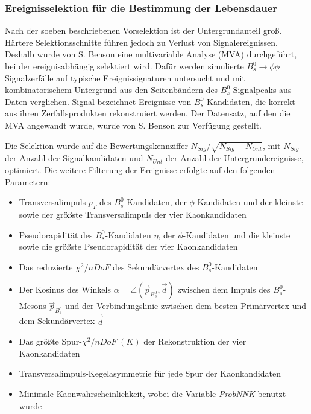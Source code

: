 \documentclass{article}
\begin{document}
\subsubsection{Ereignisselektion für die Bestimmung der Lebensdauer}%
Nach der soeben beschriebenen Vorselektion ist der Untergrundanteil groß. Härtere Selektionsschnitte führen jedoch zu Verlust von Signalereignissen. Deshalb wurde von S. Benson \cite{BensonANANOTE} eine multivariable Analyse (MVA) durchgeführt, bei der ereignisabhängig selektiert wird. Dafür werden simulierte $B_s^0 \rightarrow \phi \phi$ Signalzerfälle auf typische Ereignissignaturen untersucht und mit kombinatorischem Untergrund aus den Seitenbändern des $B_s^0$-Signalpeaks aus Daten verglichen. Signal bezeichnet Ereignisse von $B_s^0$-Kandidaten, die korrekt aus ihren Zerfallsprodukten rekonstruiert werden. Der Datensatz, auf den die MVA angewandt wurde, wurde von S. Benson zur Verfügung gestellt. 

Die Selektion wurde auf die Bewertungskennziffer %
$N_{Sig}/\sqrt{N_{Sig}+N_{Unt}}$, mit $N_{Sig}$ der Anzahl der Signalkandidaten und $N_{Unt}$ der Anzahl der Untergrundereignisse, optimiert. Die weitere Filterung der Ereignisse erfolgte auf den folgenden Parametern:  
\begin{itemize}
  \item Transversalimpuls $p_T$ des $B_s^0$-Kandidaten, der $\phi$-Kandidaten und der kleinste sowie der größste Transversalimpuls der vier Kaonkandidaten 
  \item Pseudorapidität des $B_s^0$-Kandidaten $\eta$, der $\phi$-Kandidaten und die kleinste sowie die größste Pseudorapidität der vier Kaonkandidaten 
  \item Das reduzierte $\chi^2/nDoF$ des Sekundärvertex des $B_s^0$-Kandidaten 
  \item Der Kosinus des Winkels $\alpha=\angle(\vec{p}_{B_s^0},\vec{d})$ zwischen dem Impuls des $B_s^0$-Mesons $\vec{p}_{B_s^0}$ und der Verbindungslinie zwischen dem besten Primärvertex und dem Sekundärvertex $\vec{d}$ %
  \item Das größte Spur-$\chi^2/nDoF\;(K)$ der Rekonstruktion der vier Kaonkandidaten 
  \item Transversalimpuls-Kegelasymmetrie für jede Spur der Kaonkandidaten
  \item Minimale Kaonwahrscheinlichkeit, wobei die Variable \textit{ProbNNK} benutzt wurde
\end{itemize}
\end{document}
